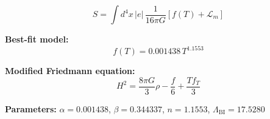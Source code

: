 
\begin{equation}
  S = \int d^4x \, |e| \, \frac{1}{16\pi G} \left[ f(T) + \mathcal{L}_m \right]
\end{equation}

\textbf{Best-fit model:}
\begin{equation}
  f(T) = 0.001438 \, T^{1.1553}
\end{equation}

\textbf{Modified Friedmann equation:}
\begin{equation}
  H^2 = \frac{8\pi G}{3} \rho - \frac{f}{6} + \frac{T f_T}{3}
\end{equation}

\textbf{Parameters:}
$\alpha = 0.001438$, \quad
$\beta = 0.344337$, \quad
$n = 1.1553$, \quad
$\Lambda_{\text{BI}} = 17.5280$